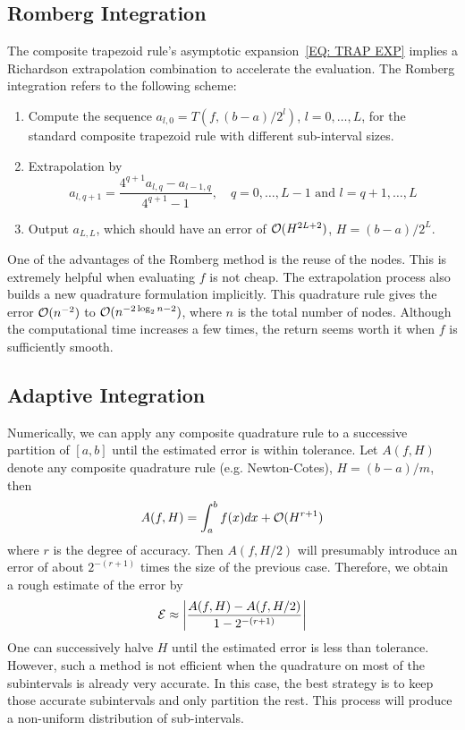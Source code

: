 \subsection{Romberg Integration}
\label{SSec: 3-ROM-INT}
The composite trapezoid rule's asymptotic expansion~\eqref{EQ: TRAP EXP} implies a Richardson extrapolation combination to accelerate the evaluation. The Romberg integration refers to the following scheme: 
\begin{enumerate}
    \item Compute the sequence $a_{l, 0} = T(f, (b-a)/2^l)$, $l=0,\dots, L$, for the standard composite trapezoid rule with different sub-interval sizes. 
    \item Extrapolation by 
    $$a_{l, q+1} = \frac{4^{q+1} a_{l, q} - a_{l-1, q}}{4^{q+1} - 1}, \quad q = 0,\dots, L-1 \text{ and } l = q+1,\dots, L$$
    \item Output $a_{L,L}$, which should have an error of $\mathcal O(H^{2L+2})$, $H = (b-a)/2^L$.
\end{enumerate}
\begin{remark}
    One of the advantages of the Romberg method is the reuse of the nodes. This is extremely helpful when evaluating $f$ is not cheap. The extrapolation process also builds a new quadrature formulation implicitly. This quadrature rule gives the error $\mathcal O(n^{-2})$ to $\mathcal O(n^{-2\log_2 n-2})$, where $n$ is the total number of nodes. Although the computational time increases a few times, the return seems worth it when $f$ is sufficiently smooth.
\end{remark}
\subsection{Adaptive Integration}
Numerically, we can apply any composite quadrature rule to a successive partition of $[a, b]$ until the estimated error is within tolerance. Let $A(f, H)$ denote any composite quadrature rule (e.g. Newton-Cotes), $H = (b-a)/m$, then 
\begin{equation}
    A(f, H) = \int_a^b f(x) dx + \mathcal O(H^{r+1})
\end{equation}
where $r$ is the degree of accuracy. Then $A(f, H/2)$ will presumably introduce an error of about $2^{-(r+1)}$ times the size of the previous case. Therefore, we obtain a rough estimate of the error by
$$\mathcal E \approx \left|\frac{A(f, H) - A(f, H/2)}{1 - 2^{-(r+1)}}\right|$$
One can successively halve $H$ until the estimated error is less than tolerance. However, such a method is not efficient when the quadrature on most of the subintervals is already very accurate. In this case, the best strategy is to keep those accurate subintervals and only partition the rest. This process will produce a non-uniform distribution of sub-intervals. 

